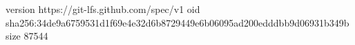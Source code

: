 version https://git-lfs.github.com/spec/v1
oid sha256:34de9a6759531d1f69e4e32d6b8729449e6b06095ad200edddbb9d06931b349b
size 87544
